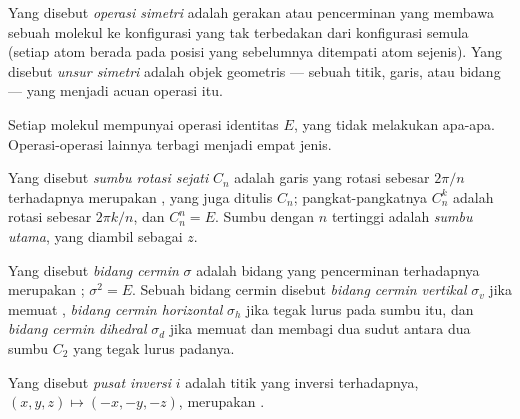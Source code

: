 \begin{definition}\label{def:b3:point-groups:operation}
Yang disebut \emph{operasi simetri} adalah gerakan
atau pencerminan yang membawa sebuah molekul ke konfigurasi yang tak
terbedakan dari konfigurasi semula (setiap atom berada pada posisi yang
sebelumnya ditempati atom sejenis). Yang disebut \emph{unsur
simetri} adalah objek geometris --- sebuah titik, garis,
atau bidang --- yang menjadi acuan operasi itu.
\end{definition}

Setiap molekul mempunyai operasi identitas $E$, yang tidak melakukan apa-apa.
Operasi-operasi lainnya terbagi menjadi empat jenis.

\begin{definition}\label{def:b3:point-groups:rotation}
Yang disebut \emph{sumbu rotasi sejati} $C_n$
adalah garis yang rotasi sebesar $2\pi/n$ terhadapnya merupakan , yang juga ditulis $C_n$; pangkat-pangkatnya $C_n^k$ adalah rotasi
sebesar $2\pi k/n$, dan $C_n^n = E$. Sumbu dengan $n$ tertinggi adalah
\emph{sumbu utama}, yang diambil sebagai $z$.
\end{definition}

\begin{definition}\label{def:b3:point-groups:mirror}
Yang disebut \emph{bidang cermin} $\sigma$ adalah bidang
yang pencerminan terhadapnya merupakan ; $\sigma^2 = E$. Sebuah
bidang cermin disebut \emph{bidang cermin
vertikal} $\sigma_v$ jika memuat , \emph{bidang cermin
horizontal} $\sigma_h$ jika tegak lurus pada
sumbu itu, dan \emph{bidang cermin dihedral}
$\sigma_d$ jika memuat  dan membagi dua sudut antara dua sumbu
$C_2$ yang tegak lurus padanya.
\end{definition}

\begin{definition}\label{def:b3:point-groups:inversion}
Yang disebut \emph{pusat inversi} $i$ adalah titik yang
inversi terhadapnya, $(x, y, z) \mapsto (-x, -y, -z)$, merupakan .
\end{definition}

